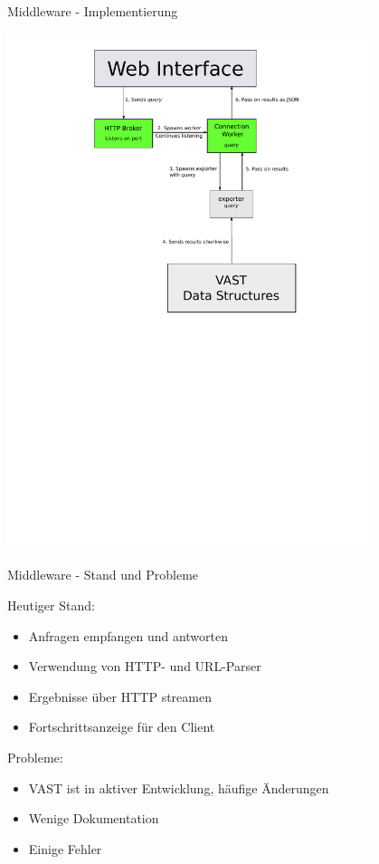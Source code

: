 \documentclass[9pt]{beamer}
\begin{document}
\begin{frame}{Middleware - Implementierung}{}
	\begin{center}
	\includegraphics[width=0.8\textwidth]{res/swp_vast_detail.pdf}
	\end{center}
\end{frame}

\begin{frame}{Middleware - Stand und Probleme}{}

	Heutiger Stand:
	\begin{itemize}
		\item Anfragen empfangen und antworten
		\item Verwendung von HTTP- und URL-Parser
		\item Ergebnisse über HTTP streamen
		\item Fortschrittsanzeige für den Client
	\end{itemize}

	Probleme:
	\begin{itemize}
		\item VAST ist in aktiver Entwicklung, häufige Änderungen
		\item Wenige Dokumentation
		\item Einige Fehler
	\end{itemize}
	
\end{frame}
\end{document}
